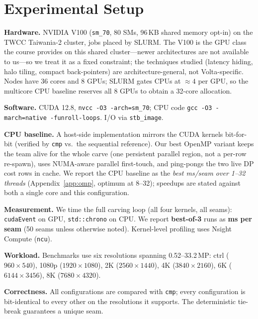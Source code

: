 \section{Experimental Setup}
\label{sec:setup}
\textbf{Hardware.} NVIDIA V100 (\texttt{sm\_70}, 80 SMs, 96\,KB shared memory
opt-in) on the TWCC Taiwania-2 cluster, jobs placed by SLURM. The V100 is the
GPU class the course provides on this shared cluster---newer architectures are
not available to us---so we treat it as a fixed constraint; the techniques
studied (latency hiding, halo tiling, compact back-pointers) are
architecture-general, not Volta-specific. Nodes have 36 cores
and 8 GPUs; SLURM gates CPUs at ${\approx}4$ per GPU, so the multicore CPU
baseline reserves all 8 GPUs to obtain a 32-core allocation.

\textbf{Software.} CUDA 12.8, \texttt{nvcc -O3 -arch=sm\_70}; CPU code
\texttt{gcc -O3 -march=native -funroll-loops}. I/O via \texttt{stb\_image}.

\textbf{CPU baseline.} A host-side implementation mirrors the CUDA kernels
bit-for-bit (verified by \texttt{cmp} vs.\ the sequential reference). Our best
OpenMP variant keeps the team alive for the whole carve (one persistent parallel
region, not a per-row re-spawn), uses NUMA-aware parallel first-touch, and
ping-pongs the two live DP cost rows in cache. We report the CPU baseline as the
\emph{best ms/seam over 1--32 threads} (Appendix~\ref{app:omp}, optimum at
8--32); speedups are stated against both a single core and this configuration.

\textbf{Measurement.} We time the full carving loop (all four kernels, all
seams): \texttt{cudaEvent} on GPU, \texttt{std::chrono} on CPU.
We report \textbf{best-of-3} runs as \textbf{ms per seam} (50 seams unless
otherwise noted). Kernel-level profiling uses Nsight Compute (\texttt{ncu}).

\textbf{Workload.} Benchmarks use six resolutions spanning 0.52--33.2\,MP:
ctrl ($960{\times}540$), 1080p ($1920{\times}1080$), 2K ($2560{\times}1440$),
4K ($3840{\times}2160$), 6K ($6144{\times}3456$), 8K ($7680{\times}4320$).

\textbf{Correctness.} All configurations are compared with \texttt{cmp};
every configuration is bit-identical to every other on the resolutions it
supports. The deterministic tie-break guarantees a unique seam.
